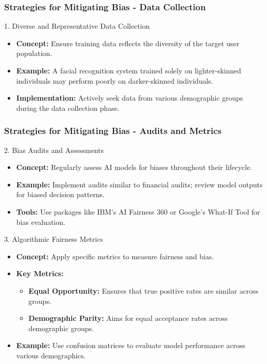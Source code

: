 \documentclass{beamer}
\begin{document}
\begin{frame}[fragile]
    \frametitle{Strategies for Mitigating Bias - Data Collection}
    \begin{block}{1. Diverse and Representative Data Collection}
        \begin{itemize}
            \item \textbf{Concept:} Ensure training data reflects the diversity of the target user population.
            \item \textbf{Example:} A facial recognition system trained solely on lighter-skinned individuals may perform poorly on darker-skinned individuals.
            \item \textbf{Implementation:} Actively seek data from various demographic groups during the data collection phase.
        \end{itemize}
    \end{block}
\end{frame}

\begin{frame}[fragile]
    \frametitle{Strategies for Mitigating Bias - Audits and Metrics}
    \begin{block}{2. Bias Audits and Assessments}
        \begin{itemize}
            \item \textbf{Concept:} Regularly assess AI models for biases throughout their lifecycle.
            \item \textbf{Example:} Implement audits similar to financial audits; review model outputs for biased decision patterns.
            \item \textbf{Tools:} Use packages like IBM’s AI Fairness 360 or Google’s What-If Tool for bias evaluation.
        \end{itemize}
    \end{block}

    \begin{block}{3. Algorithmic Fairness Metrics}
        \begin{itemize}
            \item \textbf{Concept:} Apply specific metrics to measure fairness and bias.
            \item \textbf{Key Metrics:}
            \begin{itemize}
                \item \textbf{Equal Opportunity:} Ensures that true positive rates are similar across groups.
                \item \textbf{Demographic Parity:} Aims for equal acceptance rates across demographic groups.
            \end{itemize}
            \item \textbf{Example:} Use confusion matrices to evaluate model performance across various demographics.
        \end{itemize}
    \end{block}
\end{frame}
\end{document}
